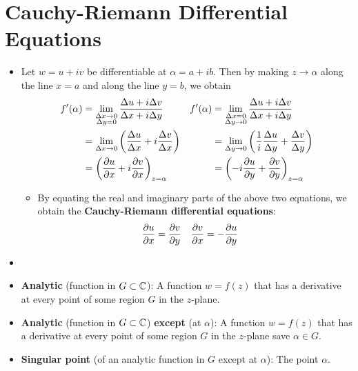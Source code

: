 \documentclass[../main.tex]{subfiles}
\begin{document}
\section{Cauchy-Riemann Differential Equations}
\begin{itemize}
    \item Let $w=u+iv$ be differentiable at $\alpha=a+ib$. Then by making $z\to\alpha$ along the line $x=a$ and along the line $y=b$, we obtain
    \begin{align*}
        f'(\alpha) &= \lim_{\substack{\Delta x\to 0\\\Delta y=0}}\frac{\Delta u+i\Delta v}{\Delta x+i\Delta y}&
            f'(\alpha) &= \lim_{\substack{\Delta x=0\\\Delta y\to 0}}\frac{\Delta u+i\Delta v}{\Delta x+i\Delta y}\\
        &= \lim_{\Delta x\to 0}\left( \frac{\Delta u}{\Delta x}+i\frac{\Delta v}{\Delta x} \right)&
            &= \lim_{\Delta y\to 0}\left( \frac{1}{i}\frac{\Delta u}{\Delta y}+\frac{\Delta v}{\Delta y} \right)\\
        &= \left( \pdv{u}{x}+i\pdv{v}{x} \right)_{z=\alpha}&
            &= \left( -i\pdv{u}{y}+\pdv{v}{y} \right)_{z=\alpha}
    \end{align*}
    \begin{itemize}
        \item By equating the real and imaginary parts of the above two equations, we obtain the \textbf{Cauchy-Riemann differential equations}:
        \begin{align*}
            \pdv{u}{x} &= \pdv{v}{y}&
            \pdv{v}{x} &= -\pdv{u}{y}
        \end{align*}
    \end{itemize}
    \item {}
    \item \textbf{Analytic} (function in $G\subset\mathbb{C}$): A function $w=f(z)$ that has a derivative at every point of some region $G$ in the $z$-plane.
    \item \textbf{Analytic} (function in $G\subset\mathbb{C}$) \textbf{except} (at $\alpha$): A function $w=f(z)$ that has a derivative at every point of some region $G$ in the $z$-plane save $\alpha\in G$.
    \item \textbf{Singular point} (of an analytic function in $G$ except at $\alpha$): The point $\alpha$.
\end{itemize}
\end{document}
